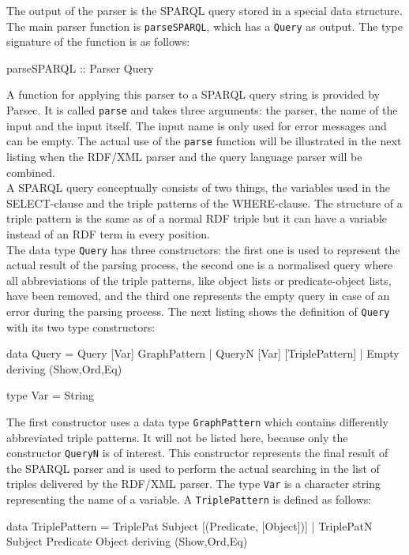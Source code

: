 \documentclass[11pt,a4paper,headsepline, bibtotoc]{scrreprt}
\begin{document}
The output of the parser is the SPARQL query stored in a special data structure. The main parser function is \texttt{parseSPARQL}, which has a \texttt{Query} as output. The type signature of the function is as follows:
\begin{code}[caption=Main Parser Function]
parseSPARQL :: Parser Query
\end{code}
A function for applying this parser to a SPARQL query string is provided by Parsec. It is called \texttt{parse} and takes three arguments: the parser, the name of the input and the input itself. The input name is only used for error messages and can be empty. The actual use of the \texttt{parse} function will be illustrated in the next listing when the RDF/XML parser and the query language parser will be combined.\\
A SPARQL query conceptually consists of two things, the variables used in the SELECT-clause and the triple patterns of the WHERE-clause. The structure of a triple pattern is the same as of a normal RDF triple but it can have a variable instead of an RDF term in every position.\\
The data type \texttt{Query} has three constructors: the first one is used to represent the actual result of the parsing process, the second one is a normalised query where all abbreviations of the triple patterns, like object lists or predicate-object lists, have been removed, and the third one represents the empty query in case of an error during the parsing process. The next listing shows the definition of \texttt{Query} with its two type constructors:
\begin{code}
data Query = Query [Var] GraphPattern 
            | QueryN [Var] [TriplePattern] 
            | Empty 
            deriving (Show,Ord,Eq)

type Var = String
\end{code}
The first constructor uses a data type \texttt{GraphPattern} which contains differently abbreviated triple patterns. It will not be listed here, because only the constructor \texttt{QueryN} is of interest. This constructor represents the final result of the SPARQL parser and is used to perform the actual searching in the list of triples delivered by the \mbox{RDF/XML} parser. The type \texttt{Var} is a character string representing the name of a variable. A \texttt{TriplePattern} is defined as follows:
\begin{code}
data TriplePattern = TriplePat Subject [(Predicate, [Object])] 
                    | TriplePatN Subject Predicate Object 
                    deriving (Show,Ord,Eq)

\end{code}
\end{document}
